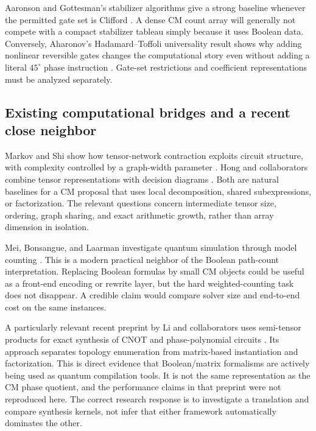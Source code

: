 Aaronson and Gottesman's stabilizer algorithms give a strong baseline whenever the permitted gate set is Clifford \cite{aaronson}. A dense CM count array will generally not compete with a compact stabilizer tableau simply because it uses Boolean data. Conversely, Aharonov's Hadamard--Toffoli universality result shows why adding nonlinear reversible gates changes the computational story even without adding a literal $45^\circ$ phase instruction \cite{aharonov}. Gate-set restrictions and coefficient representations must be analyzed separately.

\subsection{Existing computational bridges and a recent close neighbor}
Markov and Shi show how tensor-network contraction exploits circuit structure, with complexity controlled by a graph-width parameter \cite{markov}. Hong and collaborators combine tensor representations with decision diagrams \cite{tdd}. Both are natural baselines for a CM proposal that uses local decomposition, shared subexpressions, or factorization. The relevant questions concern intermediate tensor size, ordering, graph sharing, and exact arithmetic growth, rather than array dimension in isolation.

Mei, Bonsangue, and Laarman investigate quantum simulation through model counting \cite{mei}. This is a modern practical neighbor of the Boolean path-count interpretation. Replacing Boolean formulas by small CM objects could be useful as a front-end encoding or rewrite layer, but the hard weighted-counting task does not disappear. A credible claim would compare solver size and end-to-end cost on the same instances.

A particularly relevant recent preprint by Li and collaborators uses semi-tensor products for exact synthesis of CNOT and phase-polynomial circuits \cite{stp2026}. Its approach separates topology enumeration from matrix-based instantiation and factorization. This is direct evidence that Boolean/matrix formalisms are actively being used as quantum compilation tools. It is not the same representation as the CM phase quotient, and the performance claims in that preprint were not reproduced here. The correct research response is to investigate a translation and compare synthesis kernels, not infer that either framework automatically dominates the other.


